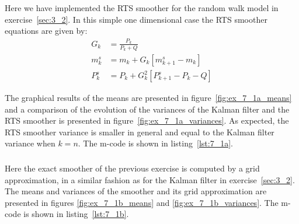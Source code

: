 \documentclass[a4paper,oneside,article]{memoir}
\begin{document}


\section{}

\subsection{}
\subsubsection{}\label{sec:7_1a}
Here we have implemented the RTS smoother for the random walk model in exercise~\ref{sec:3_2}.
In this simple one dimensional case the RTS smoother equations are given by:
\begin{align}
	G_k &=\frac{P_k}{P_k+Q}\\
	m_k^s&=m_k+G_k\left[m_{k+1}^s-m_k\right]\\
	P_k^s&=P_k+G_k^2\left[P_{k+1}^s-P_{k}-Q\right]
\end{align}

The graphical results of the means are presented in figure~\ref{fig:ex_7_1a_means} and a comparison
of the evolution of the variances of the Kalman filter and the RTS smoother is presented in
figure~\ref{fig:ex_7_1a_variances}. As expected, the RTS smoother variance is smaller in general
and equal to the Kalman filter variance when $k=n$. The m-code is shown in listing~\ref{lst:7_1a}.




\subsubsection{}\label{sec:7_1b}
Here the exact smoother of the previous exercise is computed by a grid approximation,
in a similar fashion as for the Kalman filter in exercise~\ref{sec:3_2}. The means and variances
of the smoother and its grid approximation are presented in figures \ref{fig:ex_7_1b_means} and 
\ref{fig:ex_7_1b_variances}. The m-code is shown in listing~\ref{lst:7_1b}.
\end{document}
